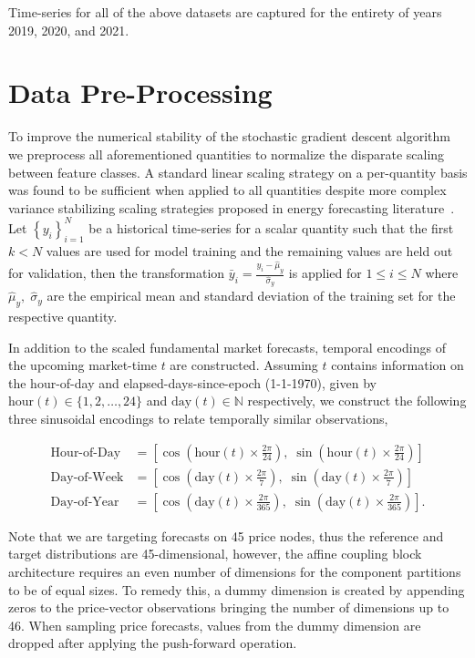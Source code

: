 Time-series for all of the above datasets are captured for the entirety of years 2019, 2020, and 2021.

\section{Data Pre-Processing}\label{sec:data-pre-processing}

To improve the numerical stability of the stochastic gradient descent algorithm we preprocess all
aforementioned quantities to normalize the disparate scaling between feature classes.
A standard linear scaling strategy on a per-quantity basis was found to be sufficient when applied to all quantities
despite more complex variance stabilizing scaling strategies proposed in energy forecasting literature~\cite{7997921}.
Let $\left\{ y_i \right\}_{i=1}^N$ be a historical time-series for a scalar quantity such that the first $k < N$ values
are used for model training and the remaining values are held out for validation, then the transformation
$\bar{y}_i = \frac{y_i - \hat{\mu}_y}{\hat{\sigma}_y}$ is applied for $1 \leq i \leq N$ where
$\hat{\mu}_y,\;\hat{\sigma}_y$ are the empirical mean and standard deviation of the training set for the respective quantity.

In addition to the scaled fundamental market forecasts, temporal encodings of the upcoming market-time $t$ are constructed.
Assuming $t$ contains information on the hour-of-day and elapsed-days-since-epoch (1-1-1970), given by
$\text{hour}(t) \in \{1, 2, \dots, 24\}$ and $\text{day}(t) \in \mathbb{N}$ respectively, we construct the following three
sinusoidal encodings to relate temporally similar observations,

\begin{align*}
    \text{Hour-of-Day} &= \left[ \cos\left( \text{hour}(t) \times \frac{2\pi}{24} \right), \; \sin\left( \text{hour}(t) \times \frac{2\pi}{24} \right)\right] \\
    \text{Day-of-Week} &= \left[ \cos\left( \text{day}(t) \times \frac{2\pi}{7} \right), \; \sin\left( \text{day}(t) \times \frac{2\pi}{7} \right)\right] \\
    \text{Day-of-Year} &= \left[ \cos\left( \text{day}(t) \times \frac{2\pi}{365} \right), \; \sin\left( \text{day}(t) \times \frac{2\pi}{365} \right)\right].
\end{align*}


Note that we are targeting forecasts on 45 price nodes, thus the reference and target
distributions are 45-dimensional, however, the affine coupling block architecture requires an even number of
dimensions for the component partitions to be of equal sizes.
To remedy this, a dummy dimension is created by appending zeros to the price-vector observations bringing the number of
dimensions up to 46.
When sampling price forecasts, values from the dummy dimension are dropped after applying the push-forward operation.

